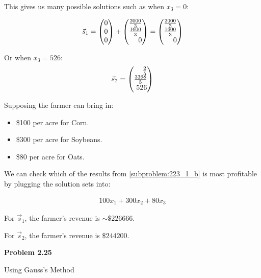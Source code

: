 \documentclass[12pt]{article}
\newenvironment{problem}[1][default]{
  \begin{framed}\begin{minipage}{0.97\textwidth}
  \setlength{\parskip}{4mm}
  {\bf Problem #1}
}{\end{minipage}\end{framed}}
\newenvironment{abc}{\begin{enumerate}[label={\bf(\alph*)}]}{\end{enumerate}}
\newcommand\m[2][]{
	\ifthenelse{\equal {#1} {}}
		{\begin{pmatrix*}[r]#2\end{pmatrix*}}
		{\left(\begin{array}{#1}#2\end{array}\right)}
}
\begin{document}
\begin{abc}
\begin{item}
	This gives us many possible solutions such as when $x_3 = 0$:

	\begin{equation}
	\begin{aligned}
		\vec{s}_1 = \m{0 \\ 0 \\ 0} + \m{\frac{2000}{3} \\ \frac{1600}{3} \\ 0} = \m{\frac{2000}{3} \\ \frac{1600}{3} \\ 0}
	\end{aligned}
	\end{equation}

	Or when $x_3 = 526$:
	\begin{equation}
	\begin{aligned}
		\vec{s}_2 = \m{\frac{2}{5} \\ \frac{3368}{5} \\ 526}
	\end{aligned}
	\end{equation}
	\end{item}

	\begin{item}
	Supposing the farmer can bring in:

	\begin{itemize}
		\item \$100 per acre for Corn.
		\item \$300 per acre for Soybeans.
		\item \$80 per acre for Oats.
	\end{itemize}

	We can check which of the results from \ref{subproblem:223_1_b} is most 
	profitable by plugging the solution sets into:

	\begin{equation}
	\begin{aligned}
		100x_1 + 300x_2 + 80x_3
	\end{aligned}
	\end{equation}

	For $\vec{s}_1$, the farmer's revenue is $\sim\$226666$.

	For $\vec{s}_2$, the farmer's revenue is $\$244200$.

	\end{item}
\end{abc}

\begin{problem}[2.25]
	Using Gauss's Method
\end{problem}
\end{document}
